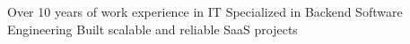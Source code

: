 \documentclass[9pt]{developercv} %
\begin{document}
\vspace{0.5cm}



\begin{minipage}[t]{0.4\textwidth} %
	\vspace{-\baselineskip} %
	Over 10 years of work experience in IT\newline\newline
    Specialized in Backend Software Engineering\newline\newline
    Built scalable and reliable SaaS projects\newline\newline
\end{minipage}
\hfill %
\begin{minipage}[t]{0.5\textwidth} %
	\vspace{-\baselineskip} %
	\begin{barchart}{5.5}
	\end{barchart}
\end{minipage}


\end{document}
